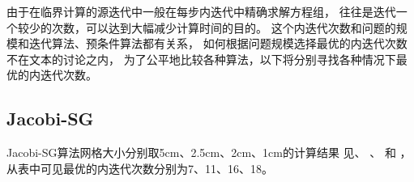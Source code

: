 由于在临界计算的源迭代中一般在每步内迭代中精确求解方程组，
往往是迭代一个较少的次数，可以达到大幅减少计算时间的目的。
这个内迭代次数和问题的规模和迭代算法、预条件算法都有关系，
如何根据问题规模选择最优的内迭代次数不在文本的讨论之内，
为了公平地比较各种算法，以下将分别寻找各种情况下最优的内迭代次数。

\subsection{Jacobi-SG}
\label{sec:equsolve.iter.jacobi-sg}

Jacobi-SG算法网格大小分别取5cm、2.5cm、2cm、1cm的计算结果
见、%
、%
和%
，
从表中可见最优的内迭代次数分别为7、11、16、18。

